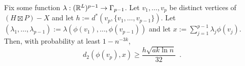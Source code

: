 \documentclass{patmorin}
\renewcommand{\ge}{\geqslant}
\begin{document}
\begin{lem}\label{crux}
  Fix some function $\lambda:(\mathbb{R}^{L})^{p-1}\to \Gamma_{p-1}$.
  Let $v_1,\ldots,v_p$ be distinct vertices of $(H\boxtimes P)-X$ and let $h:=d^*(v_p,\{v_1,\ldots,v_{p-1}\})$.  Let $(\lambda_1,\ldots,\lambda_{p-1}):=\lambda(\phi(v_1),\ldots,\phi(v_{p-1}))$ and let $x:=\sum_{j=1}^{p-1}\lambda_j\phi(v_j)$.
  Then, with probability at least $1-n^{-3k}$,
  \[
    d_2(\phi(v_p),x)\ge \frac{h\sqrt{ak\ln n}}{32} \enspace
  . \]
\end{lem}
\end{document}
